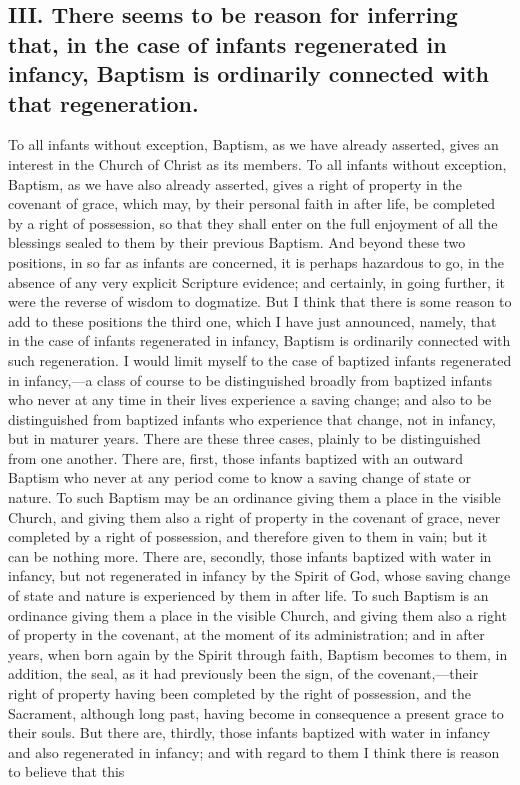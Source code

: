\documentclass[]{book}
\begin{document}
\hypertarget{iii.-there-seems-to-be-reason-for-inferring-that-in-the-case-of-infants-regenerated-in-infancy-baptism-is-ordinarily-connected-with-that-regeneration.}{%
\subsection{III. There seems to be reason for inferring that, in the case of infants regenerated in infancy, Baptism is ordinarily connected with that regeneration.}\label{iii.-there-seems-to-be-reason-for-inferring-that-in-the-case-of-infants-regenerated-in-infancy-baptism-is-ordinarily-connected-with-that-regeneration.}}

To all infants without exception, Baptism, as we have already asserted, gives an interest in the Church of Christ as its members. To all infants without exception, Baptism, as we have also already asserted, gives a right of property in the covenant of grace, which may, by their personal faith in after life, be completed by a right of possession, so that they shall enter on the full enjoyment of all the blessings sealed to them by their previous Baptism. And beyond these two positions, in so far as infants are concerned, it is perhaps hazardous to go, in the absence of any very explicit Scripture evidence; and certainly, in going further, it were the reverse of wisdom to dogmatize. But I think that there is some reason to add to these positions the third one, which I have just announced, namely, that in the case of infants regenerated in infancy, Baptism is ordinarily connected with such regeneration. I would limit myself to the case of baptized infants regenerated in infancy,---a class of course to be distinguished broadly from baptized infants who never at any time in their lives experience a saving change; and also to be distinguished from baptized infants who experience that change, not in infancy, but in maturer years. There are these three cases, plainly to be distinguished from one another. There are, first, those infants baptized with an outward Baptism who never at any period come to know a saving change of state or nature. To such Baptism may be an ordinance giving them a place in the visible Church, and giving them also a right of property in the covenant of grace, never completed by a right of possession, and therefore given to them in vain; but it can be nothing more. There are, secondly, those infants baptized with water in infancy, but not regenerated in infancy by the Spirit of God, whose saving change of state and nature is experienced by them in after life. To such Baptism is an ordinance giving them a place in the visible Church, and giving them also a right of property in the covenant, at the moment of its administration; and in after years, when born again by the Spirit through faith, Baptism becomes to them, in addition, the seal, as it had previously been the sign, of the covenant,---their right of property having been completed by the right of possession, and the Sacrament, although long past, having become in consequence a present grace to their souls. But there are, thirdly, those infants baptized with water in infancy and also regenerated in infancy; and with regard to them I think there is reason to believe that this 
\end{document}
